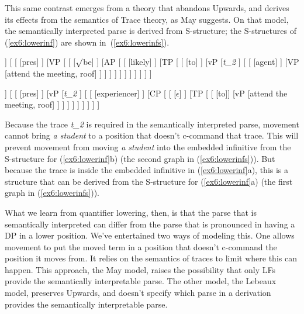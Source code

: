 This same contrast emerges from a theory that abandons Upwards, and derives its effects from the semantics of Trace theory, as May suggests. On that model, the semantically interpreted parse is derived from S-structure; the S-structures of (\ref{ex6:lowerinf}) are shown in~(\ref{ex6:lowerinfs}).
\medskip
\begin{fullwidth}
\begin{exe}
\raggedright
	\ex \label{ex6:lowerinfs}
	\footnotesize
	\begin{forest}
	[TP
		[DP^2 [a student, roof] ]
		[
			[ [pres] ]
			[VP [
				[ ]
				[AP [
					[ [likely] ]
					[TP [
						[ [to] ]
						[vP
							[\emph{t_2} ]
							[
								[ [agent] ]
								[VP [attend the meeting, roof] ]
							 ]
						 ]
					] ]
				] ]
			] ]
		 ]
	]
	\end{forest}
	\hspace*{-50pt}
	\begin{forest}
	[TP
		[DP^2  [a student, roof]]
		[\ibar{T} 
			[ [pres] ]
			[vP
				[\emph{t_2} ]
				[\ibar{v} 
					[ ]
					[CP [\ibar{C}
						[\obar{C} [$\epsilon$] ]
						[TP [\ibar{T}
							[\obar{T} [to]]
							[vP [attend the meeting, roof] ]
						] ]
					] ]
				 ]
			 ]
		]
	]
	\end{forest}
\end{exe}	
\end{fullwidth}
\medskip
Because the trace \emph{t_2} is required in the semantically interpreted parse, movement cannot bring \emph{a student} to a position that doesn't c-command that trace. This will prevent movement from moving \emph{a student} into the embedded infinitive from the S-structure for (\ref{ex6:lowerinf}b) (the second graph in (\ref{ex6:lowerinfs})). But because the trace is inside the embedded infinitive in (\ref{ex6:lowerinf}a), this is a structure that can be derived from the S-structure for (\ref{ex6:lowerinf}a) (the first graph in (\ref{ex6:lowerinfs})).

What we learn from quantifier lowering, then, is that the parse that is semantically interpreted can differ from the parse that is pronounced in having a DP in a lower position. We've entertained two ways of modeling this. One allows movement to put the moved term in a position that doesn't c-command the position it moves from. It relies on the semantics of traces to limit where this can happen. This approach, the May model, raises the possibility that only LFs provide the semantically interpretable parse. The other model, the Lebeaux model, preserves Upwards, and doesn't specify which parse in a derivation provides the semantically interpretable parse.

